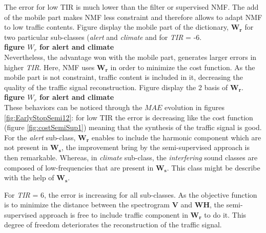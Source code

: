 \documentclass[twocolumn,a4paper,10pt]{article}
\begin{document}
The error for low TIR is much lower than the filter or supervised NMF. The add of the mobile part makes NMF less constraint and therefore allows to adapt NMF to low traffic contents. Figure display the mobile part of the dictionary, $\mathbf{W_r}$ for two particular sub-classes (\textit{alert} and \textit{climate} and for \textit{TIR} = -6.\\


\textbf{figure $W_r$ for alert and climate}\\

Nevertheless, the advantage won with the mobile part, generates larger errors in higher \textit{TIR}. Here, NMF uses $\mathbf{W_r}$ in order to minimize the cost function. As the mobile part is not constraint, traffic content is included in it, decreasing the quality of the traffic signal reconstruction. Figure display the 2 basis of $\mathbf{W_r}$. \\

\textbf{figure $W_r$ for alert and climate}\\

These behaviors can be noticed through the $MAE$ evolution in figures \ref{fig:EarlyStopSemi12}: for low TIR the error is decreasing like the cost function (figure \ref{fig:costSemiSup1}) meaning that the synthesis of the traffic signal is good. For the \textit{alert} sub-class, $\mathbf{W_r}$ enables to include the harmonic component which are not present in $\mathbf{W_s}$, the improvement bring by the semi-supervised approach is then remarkable. Whereas, in \textit{climate} sub-class, the \textit{interfering} sound classes are composed of low-frequencies that are present in $\mathbf{W_s}$. This class might be describe with the help of $\mathbf{W_s}$.

For \textit{TIR} = 6, the error is increasing for all sub-classes. As the objective function is to minimize the distance between the spectrogram $\mathbf{V}$ and $\mathbf{WH}$, the semi-supervised approach is free to include traffic component in $\mathbf{W_r}$ to do it. This degree of freedom deteriorates the reconstruction of the traffic signal. \\
\end{document}
